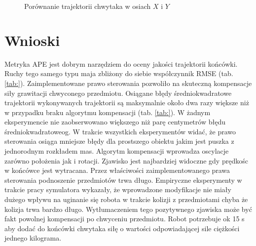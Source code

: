 \begin{figure}[H]
	\centering
	\hfill
	\caption{Porównanie trajektorii chwytaka w osiach $X$ i $Y$}
	\label{fig:obrt_porow_przedm_bok}
\end{figure}


\section{Wnioski}

Metryka APE jest dobrym narzędziem do oceny jakości trajektorii końcówki. Ruchy tego samego typu maja zbliżony do siebie współczynnik RMSE (tab. \ref{tab:}). 
Zaimplementowane prawo sterowania pozwoliło na skuteczną kompensacje siły grawitacji chwyconego przedmiotu. Osiągane błędy średniokwadratowe trajektorii wykonywanych trajektorii są maksymalnie około dwa razy większe niż w przypadku braku algorytmu kompensacji (tab. \ref{tab:}). W żadnym eksperymencie nie zaobserwowano większego niż parę centymetrów błędu średniokwadratoweog. W trakcie wszystkich eksperymentów widać, że prawo sterowania osiąga mniejsze błędy dla prostszego obiektu jakim jest puszka z jednorodnym rozkładem mas. Algorytm kompensacji wprowadza oscylacje zarówno położenia jak i rotacji. Zjawisko jest najbardziej widoczne gdy prędkośc w końcówce jest wytracana. Przez właściwości zaimplementowanego prawa sterowania podnoszenie przedmiotów trwa długo. Empiryczne eksperymenty w trakcie pracy symulatora wykazały, że wprowadzone modyfikacje nie miały dużego wpływu na uginanie się robota w trakcie kolizji z przedmiotami chyba że kolizja trwa bardzo długo. Wytłumaczeniem tego pozytywnego zjawiska może być fakt powolnej kompensacji po chwyceniu przedmiotu. Robot potrzebuje ok 15 s aby dodać do końcówki chwytaka siłę o wartości odpowiadającej sile ciężkości jednego kilograma. 

